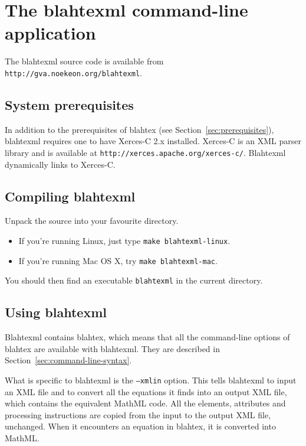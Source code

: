 \documentclass{article}
\begin{document}
\section{The blahtexml command-line application}\label{sec:blahtexml}

The blahtexml source code is available from \texttt{http://gva.noekeon.org/blahtexml}.

\subsection{System prerequisites}\label{sec:blahtexml-prerequisites}

In addition to the prerequisites of blahtex (see Section~\ref{sec:prerequisites}), blahtexml requires one to have Xerces-C 2.x installed. Xerces-C is an XML parser library and is available at \texttt{http://xerces.apache.org/xerces-c/}. Blahtexml dynamically links to Xerces-C.

\subsection{Compiling blahtexml}\label{sec:compiling-blahtexml}

Unpack the source into your favourite directory.
\begin{itemize}
\item If you're running Linux, just type \texttt{make blahtexml-linux}.
\item If you're running Mac OS X, try \texttt{make blahtexml-mac}.
\end{itemize}
You should then find an executable \texttt{blahtexml} in the current directory.

\subsection{Using blahtexml}\label{sec:blahtexml-command-line-syntax}

Blahtexml contains blahtex, which means that all the command-line options of blahtex are available with blahtexml. They are described in Section~\ref{sec:command-line-syntax}.

What is specific to blahtexml is the \texttt{--xmlin} option. This tells blahtexml to input an XML file and to convert all the equations it finds into an output XML file, which contains the equivalent MathML code. All the elements, attributes and processing instructions are copied from the input to the output XML file, unchanged. When it encounters an equation in blahtex, it is converted into MathML.
\end{document}

